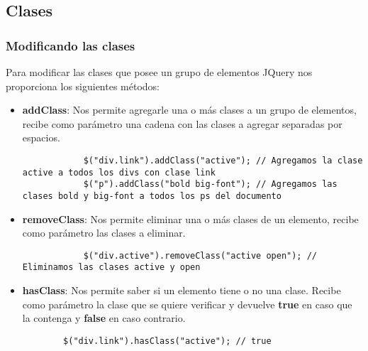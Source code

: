 \documentclass[10pt]{beamer}
\begin{document}
\subsection{Clases}
\begin{frame}[fragile]
	\frametitle{Modificando las clases}
	
	\pause Para modificar las clases que posee un grupo de elementos JQuery nos proporciona los siguientes métodos:
	
	\begin{itemize}
		\pause \item \textbf{addClass}: Nos permite agregarle una o más clases a un grupo de elementos, recibe como parámetro
				 una cadena con las clases a agregar separadas por espacios.
		\pause \begin{lstlisting}
			$("div.link").addClass("active"); // Agregamos la clase active a todos los divs con clase link
			$("p").addClass("bold big-font"); // Agregamos las clases bold y big-font a todos los ps del documento
		\end{lstlisting}
		
		\pause \item \textbf{removeClass}: Nos permite eliminar una o más clases de un elemento, recibe como parámetro las clases a eliminar.
		\pause \begin{lstlisting}
			$("div.active").removeClass("active open"); // Eliminamos las clases active y open
		\end{lstlisting}
		
		\pause \item \textbf{hasClass}: Nos permite saber si un elemento tiene o no una clase. Recibe como parámetro la clase
			que se quiere verificar y devuelve \textbf{true} en caso que la contenga y \textbf{false} en caso contrario.
		\pause \begin{lstlisting}
		$("div.link").hasClass("active"); // true
		\end{lstlisting}
	\end{itemize}
\end{frame}
\end{document}
